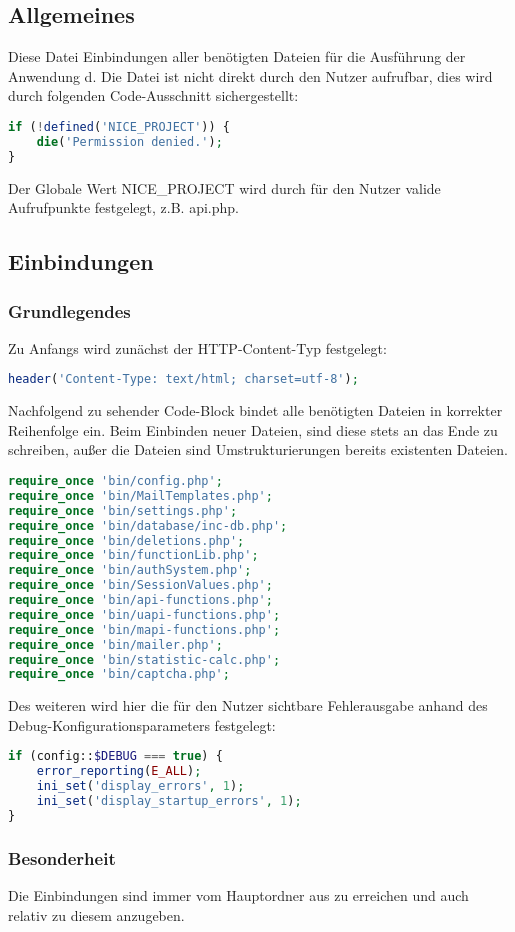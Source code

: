 \subsection{Allgemeines} Diese Datei Einbindungen aller benötigten Dateien für die Ausführung der Anwendung d.
Die Datei ist nicht direkt durch den Nutzer aufrufbar, dies wird durch folgenden Code-Ausschnitt sichergestellt:
\begin{lstlisting}[language=php]
if (!defined('NICE_PROJECT')) {
	die('Permission denied.');
}
\end{lstlisting}
Der Globale Wert {\glqq NICE\_PROJECT\grqq} wird durch für den Nutzer valide Aufrufpunkte festgelegt, z.B. {\glqq api.php\grqq}.
\newpage
\subsection{Einbindungen}
\subsubsection{Grundlegendes}
Zu Anfangs wird zunächst der HTTP-Content-Typ festgelegt:
\begin{lstlisting}[language=php]
header('Content-Type: text/html; charset=utf-8');
\end{lstlisting}
Nachfolgend zu sehender Code-Block bindet alle benötigten Dateien in korrekter Reihenfolge ein. Beim Einbinden neuer Dateien, sind diese stets an das Ende zu schreiben, außer die Dateien sind Umstrukturierungen bereits existenten Dateien.
\begin{lstlisting}[language=php]
require_once 'bin/config.php';
require_once 'bin/MailTemplates.php';
require_once 'bin/settings.php';
require_once 'bin/database/inc-db.php';
require_once 'bin/deletions.php';
require_once 'bin/functionLib.php';
require_once 'bin/authSystem.php';
require_once 'bin/SessionValues.php';
require_once 'bin/api-functions.php';
require_once 'bin/uapi-functions.php';
require_once 'bin/mapi-functions.php';
require_once 'bin/mailer.php';
require_once 'bin/statistic-calc.php';
require_once 'bin/captcha.php';
\end{lstlisting}
Des weiteren wird hier die für den Nutzer sichtbare Fehlerausgabe anhand des Debug-Konfigurationsparameters festgelegt:
\begin{lstlisting}[language=php]
if (config::$DEBUG === true) {
	error_reporting(E_ALL);
	ini_set('display_errors', 1);
	ini_set('display_startup_errors', 1);
}
\end{lstlisting}
\subsubsection{Besonderheit}
Die Einbindungen sind immer vom Hauptordner aus zu erreichen und auch relativ zu diesem anzugeben.
